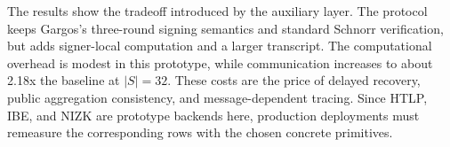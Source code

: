 The results show the tradeoff introduced by the auxiliary layer.  The protocol
keeps Gargos's three-round signing semantics and standard Schnorr verification,
but adds signer-local computation and a larger transcript.  The computational
overhead is modest in this prototype, while communication increases to about
2.18x the baseline at $|S|=32$.  These costs are the price of delayed recovery,
public aggregation consistency, and message-dependent tracing.  Since HTLP, IBE,
and NIZK are prototype backends here, production deployments must remeasure the
corresponding rows with the chosen concrete primitives.
